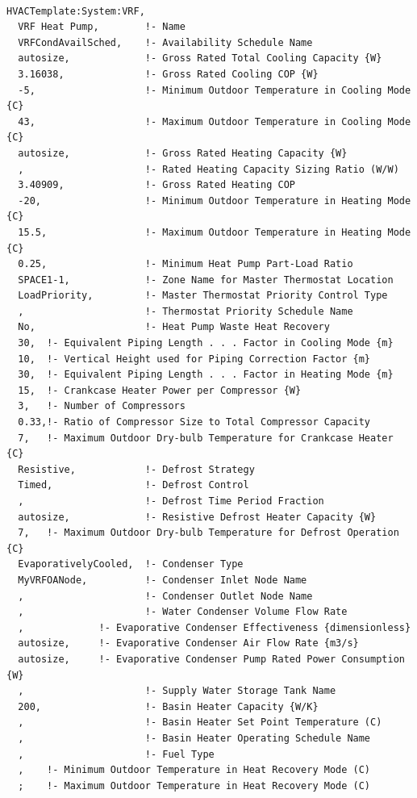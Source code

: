 \begin{lstlisting}

HVACTemplate:System:VRF,
  VRF Heat Pump,        !- Name
  VRFCondAvailSched,    !- Availability Schedule Name
  autosize,             !- Gross Rated Total Cooling Capacity {W}
  3.16038,              !- Gross Rated Cooling COP {W}
  -5,                   !- Minimum Outdoor Temperature in Cooling Mode {C}
  43,                   !- Maximum Outdoor Temperature in Cooling Mode {C}
  autosize,             !- Gross Rated Heating Capacity {W}
  ,                     !- Rated Heating Capacity Sizing Ratio (W/W)
  3.40909,              !- Gross Rated Heating COP
  -20,                  !- Minimum Outdoor Temperature in Heating Mode {C}
  15.5,                 !- Maximum Outdoor Temperature in Heating Mode {C}
  0.25,                 !- Minimum Heat Pump Part-Load Ratio
  SPACE1-1,             !- Zone Name for Master Thermostat Location
  LoadPriority,         !- Master Thermostat Priority Control Type
  ,                     !- Thermostat Priority Schedule Name
  No,                   !- Heat Pump Waste Heat Recovery
  30,  !- Equivalent Piping Length . . . Factor in Cooling Mode {m}
  10,  !- Vertical Height used for Piping Correction Factor {m}
  30,  !- Equivalent Piping Length . . . Factor in Heating Mode {m}
  15,  !- Crankcase Heater Power per Compressor {W}
  3,   !- Number of Compressors
  0.33,!- Ratio of Compressor Size to Total Compressor Capacity
  7,   !- Maximum Outdoor Dry-bulb Temperature for Crankcase Heater {C}
  Resistive,            !- Defrost Strategy
  Timed,                !- Defrost Control
  ,                     !- Defrost Time Period Fraction
  autosize,             !- Resistive Defrost Heater Capacity {W}
  7,   !- Maximum Outdoor Dry-bulb Temperature for Defrost Operation {C}
  EvaporativelyCooled,  !- Condenser Type
  MyVRFOANode,          !- Condenser Inlet Node Name
  ,                     !- Condenser Outlet Node Name
  ,                     !- Water Condenser Volume Flow Rate
  ,             !- Evaporative Condenser Effectiveness {dimensionless}
  autosize,     !- Evaporative Condenser Air Flow Rate {m3/s}
  autosize,     !- Evaporative Condenser Pump Rated Power Consumption {W}
  ,                     !- Supply Water Storage Tank Name
  200,                  !- Basin Heater Capacity {W/K}
  ,                     !- Basin Heater Set Point Temperature (C)
  ,                     !- Basin Heater Operating Schedule Name
  ,                     !- Fuel Type
  ,    !- Minimum Outdoor Temperature in Heat Recovery Mode (C)
  ;    !- Maximum Outdoor Temperature in Heat Recovery Mode (C)
\end{lstlisting}

